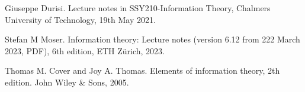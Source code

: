 \documentclass[11pt,a4paper]{article}
\begin{document}
% 
% 

\begin{thebibliography}{9}
    Giuseppe Durisi. Lecture notes in SSY210-Information Theory, Chalmers University of Technology, 19th May 2021.

    Stefan M Moser. Information theory: Lecture notes (version 6.12 from 222 March 2023, PDF), 6th edition, ETH Z{ü}rich, 2023.

    Thomas M. Cover and Joy A. Thomas. Elements of information theory, 2th edition. John Wiley \& Sons, 2005.

        
\end{thebibliography}
        
    
\end{document}
